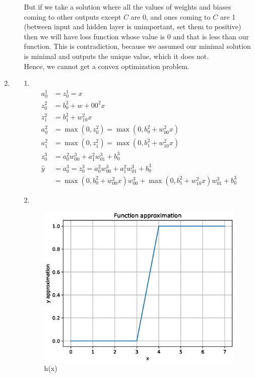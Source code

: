 \documentclass[10pt,a4paper]{article}
\begin{document}
\begin{enumerate}
\begin{enumerate}
But if we take a solution where all the values of weights and biases coming to other outputs except $C$ are 0, and ones coming to $C$ are 1 (between input and hidden layer is unimportant, set them to positive) then we will have loss function whose value is 0 and that is less than our function. This is contradiction, because we assumed our minimal solution is minimal and outputs the unique value, which it does not. 
\\Hence, we cannot get a convex optimization problem.
\end{enumerate}
\item
\begin{enumerate}
\item[1.]
\begin{align*}
a_0^1&= z_0^1=x \\
z_0^2&=b_0^2+w+{00}^2x\\
z_1^2&=b_1^2+w_{10}^2x\\
a_0^2&=\max(0, z_0^2)=\max(0,b_0^2+w_{00}^2x)\\
a_1^2&=\max(0, z_1^2)=\max(0, b_1^2+w_{10}^2x)\\
z_0^3&=a_0^2w_{00}^3+a_1^2w_{01}^3+b_0^3\\
\hat{y}&=a_0^3=z_0^3= a_0^2w_{00}^3+a_1^2w_{01}^3+b_0^3\\
&= \max(0, b_0^2+w_{00}^2x)w_{00}^3+\max(0,b_1^2+w_{10}^2x)w_{01}^3+b_0^3			
\end{align*}
\item[2.]
\begin{figure}
\includegraphics[scale=1]{graph.eps}
\caption{h(x)}
\end{figure}

\end{enumerate}
\end{enumerate}
\end{document}
